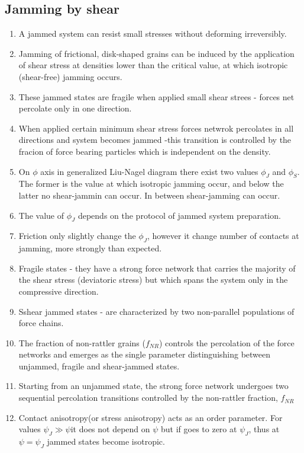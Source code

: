 \documentclass[10pt,a4paper]{article}
\begin{document}
\subsection{Jamming by shear\cite{bi:11}}
\begin{enumerate}
 \item A jammed system can resist small stresses without deforming irreversibly.
 \item Jamming of frictional, disk-shaped grains can be induced by the application of shear 
 stress at densities lower than the critical value, at which isotropic (shear-free) jamming occurs.
 \item These jammed states are fragile when applied small shear strees - forces net percolate only in one direction.
 \item When applied certain minimum  shear stress forces netwrok percolates in all directions and system becomes jammed -this transition is controlled 
 by the fracion of force bearing particles which is independent on the density.
 \item On $\phi$ axis in generalized Liu-Nagel diagram there exist two values $\phi_J$ and $\phi_S$. The former is the value at which isotropic jamming occur,
 and below the latter no shear-jammin can occur. In between shear-jamming can occur. 
 \item The value of $\phi_J$ depends on the protocol of jammed system preparation. 
 \item Friction only slightly change the $\phi_J$, however it change number of contacts at jamming, more strongly than expected.
 \item Fragile states - they have a strong force network that carries the majority of the shear stress (deviatoric stress) 
 but which spans the system only in the compressive direction. 
 \item Sshear jammed states - are characterized by two non-parallel populations of force chains.
 \item The fraction of non-rattler grains ($f_{NR}$) controls the percolation of the force networks and emerges as the single parameter distinguishing between unjammed, fragile and shear-jammed states.
 \item Starting from an unjammed state, the strong force network undergoes two sequential percolation transitions controlled by the non-rattler fraction, $f_{NR}$
 \item Contact anisotropy(or stress anisotropy) acts as an order parameter. For values $\psi_J \gg \psi $it does not depend on $\psi$ but if goes to zero at $\psi_J$,
 thus at $\psi=\psi_J$ jammed states become isotropic.
\end{enumerate}
\end{document}
